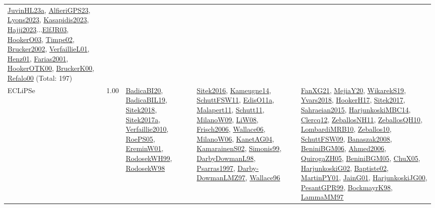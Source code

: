 {\begin{longtable}{p{3cm}r>{\raggedright\arraybackslash}p{6cm}>{\raggedright\arraybackslash}p{6cm}>{\raggedright\arraybackslash}p{8cm}}
\hyperref[detail:JuvinHL23a]{JuvinHL23a}, \hyperref[detail:AlfieriGPS23]{AlfieriGPS23}, \hyperref[detail:Lyons2023]{Lyons2023}, \hyperref[detail:Kasapidis2023]{Kasapidis2023}, \hyperref[detail:Hajji2023]{Hajji2023}...\hyperref[detail:ElfJR03]{ElfJR03}, \hyperref[detail:HookerO03]{HookerO03}, \hyperref[detail:Timpe02]{Timpe02}, \hyperref[detail:Brucker2002]{Brucker2002}, \hyperref[detail:VerfaillieL01]{VerfaillieL01}, \hyperref[detail:Henz01]{Henz01}, \hyperref[detail:Farias2001]{Farias2001}, \hyperref[detail:HookerOTK00]{HookerOTK00}, \hyperref[detail:BruckerK00]{BruckerK00}, \hyperref[detail:Refalo00]{Refalo00} (Total: 197)\\
\index{ECLiPSe}\index{CPSystems!ECLiPSe}ECLiPSe &  1.00 & \hyperref[detail:BadicaBI20]{BadicaBI20}, \hyperref[detail:BadicaBIL19]{BadicaBIL19}, \hyperref[detail:Sitek2018]{Sitek2018}, \hyperref[detail:Sitek2017a]{Sitek2017a}, \hyperref[detail:Verfaillie2010]{Verfaillie2010}, \hyperref[detail:RoePS05]{RoePS05}, \hyperref[detail:EreminW01]{EreminW01}, \hyperref[detail:RodosekWH99]{RodosekWH99}, \hyperref[detail:RodosekW98]{RodosekW98} & \hyperref[detail:Sitek2016]{Sitek2016}, \hyperref[detail:Kameugne14]{Kameugne14}, \hyperref[detail:SchuttFSW11]{SchuttFSW11}, \hyperref[detail:EdisO11a]{EdisO11a}, \hyperref[detail:Malapert11]{Malapert11}, \hyperref[detail:Schutt11]{Schutt11}, \hyperref[detail:MilanoW09]{MilanoW09}, \hyperref[detail:LiW08]{LiW08}, \hyperref[detail:Frisch2006]{Frisch2006}, \hyperref[detail:Wallace06]{Wallace06}, \hyperref[detail:MilanoW06]{MilanoW06}, \hyperref[detail:KanetAG04]{KanetAG04}, \hyperref[detail:KamarainenS02]{KamarainenS02}, \hyperref[detail:Simonis99]{Simonis99}, \hyperref[detail:DarbyDowmanL98]{DarbyDowmanL98}, \hyperref[detail:Psarras1997]{Psarras1997}, \hyperref[detail:Darby-DowmanLMZ97]{Darby-DowmanLMZ97}, \hyperref[detail:Wallace96]{Wallace96} & \hyperref[detail:FanXG21]{FanXG21}, \hyperref[detail:MejiaY20]{MejiaY20}, \hyperref[detail:WikarekS19]{WikarekS19}, \hyperref[detail:Yvars2018]{Yvars2018}, \hyperref[detail:HookerH17]{HookerH17}, \hyperref[detail:Sitek2017]{Sitek2017}, \hyperref[detail:Sahraeian2015]{Sahraeian2015}, \hyperref[detail:HarjunkoskiMBC14]{HarjunkoskiMBC14}, \hyperref[detail:Clercq12]{Clercq12}, \hyperref[detail:ZeballosNH11]{ZeballosNH11}, \hyperref[detail:ZeballosQH10]{ZeballosQH10}, \hyperref[detail:LombardiMRB10]{LombardiMRB10}, \hyperref[detail:Zeballos10]{Zeballos10}, \hyperref[detail:SchuttFSW09]{SchuttFSW09}, \hyperref[detail:Banaszak2008]{Banaszak2008}, \hyperref[detail:BeniniBGM06]{BeniniBGM06}, \hyperref[detail:Ahmed2006]{Ahmed2006}, \hyperref[detail:QuirogaZH05]{QuirogaZH05}, \hyperref[detail:BeniniBGM05]{BeniniBGM05}, \hyperref[detail:ChuX05]{ChuX05}, \hyperref[detail:HarjunkoskiG02]{HarjunkoskiG02}, \hyperref[detail:Baptiste02]{Baptiste02}, \hyperref[detail:MartinPY01]{MartinPY01}, \hyperref[detail:JainG01]{JainG01}, \hyperref[detail:HarjunkoskiJG00]{HarjunkoskiJG00}, \hyperref[detail:PesantGPR99]{PesantGPR99}, \hyperref[detail:BockmayrK98]{BockmayrK98}, \hyperref[detail:LammaMM97]{LammaMM97}\\

\end{longtable}}
